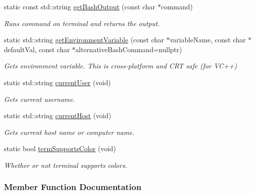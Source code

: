 \begin{DoxyCompactItemize}
\item 
static const std\+::string \hyperlink{a00063_a91304c76c872459eaa9fdb3466367cd3}{get\+Bash\+Output} (const char $\ast$command)
\begin{DoxyCompactList}\small\item\em Runs command on terminal and returns the output. \end{DoxyCompactList}\item 
static std\+::string \hyperlink{a00063_a91540f3d8c87bd121e55fc39270eac3c}{get\+Environment\+Variable} (const char $\ast$variable\+Name, const char $\ast$default\+Val, const char $\ast$alternative\+Bash\+Command=nullptr)
\begin{DoxyCompactList}\small\item\em Gets environment variable. This is cross-\/platform and C\+R\+T safe (for V\+C++) \end{DoxyCompactList}\item 
\hypertarget{a00063_ac7839ecd50e379dbdfcfce130906386e}{}static std\+::string \hyperlink{a00063_ac7839ecd50e379dbdfcfce130906386e}{current\+User} (void)\label{a00063_ac7839ecd50e379dbdfcfce130906386e}

\begin{DoxyCompactList}\small\item\em Gets current username. \end{DoxyCompactList}\item 
static std\+::string \hyperlink{a00063_aae4fdf83828228fc440f8a875c5942b0}{current\+Host} (void)
\begin{DoxyCompactList}\small\item\em Gets current host name or computer name. \end{DoxyCompactList}\item 
\hypertarget{a00063_a2c941329a14ce0ea920f57779857864c}{}static bool \hyperlink{a00063_a2c941329a14ce0ea920f57779857864c}{term\+Supports\+Color} (void)\label{a00063_a2c941329a14ce0ea920f57779857864c}

\begin{DoxyCompactList}\small\item\em Whether or not terminal supports colors. \end{DoxyCompactList}\end{DoxyCompactItemize}


\subsubsection{Member Function Documentation}
\hypertarget{a00063_aae4fdf83828228fc440f8a875c5942b0}{}
